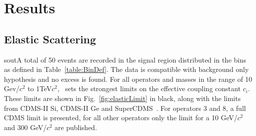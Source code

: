 \section{Results}
\subsection{Elastic Scattering}
sout{A total of 50 events are recorded in the signal region distributed in the bins as defined in Table~\ref{table:BinDef}.} The data is compatible with background only hypothesis and no excess is found. For all operators and masses in the range of 10 Gev/$c^2$ to 1TeV$c^2$, \Xehund\ sets the strongest limits on the effective coupling constant $c_i$. These limits are shown in Fig.~\ref{fig:elasticLimit} in black, along with the limits from CDMS-II Si, CDMS-II Ge and SuperCDMS~\cite{CDMSEFT}. For operators 3 and 8, a full CDMS limit is presented, for all other operators only the limit for a 10 GeV/$c^2$ and 300 GeV/$c^2$ are published.  

